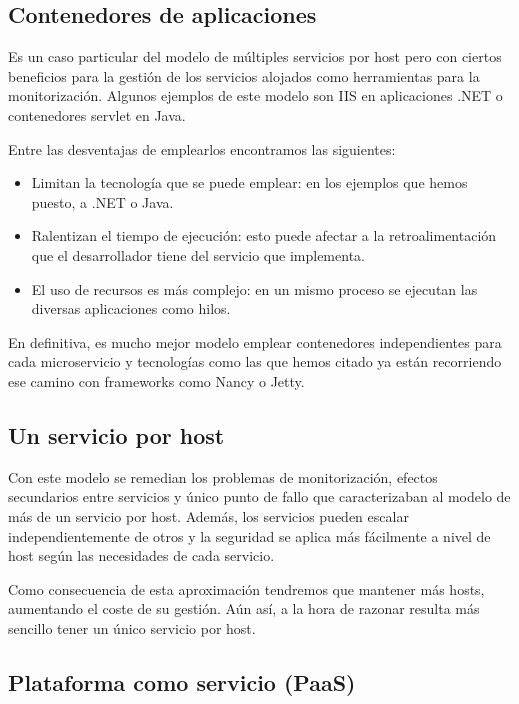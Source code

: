 \documentclass[11pt,a4paper]{article}
\begin{document}
\subsection{Contenedores de aplicaciones}

Es un caso particular del modelo de múltiples servicios por host pero con ciertos beneficios para la gestión de los servicios alojados como herramientas para la monitorización. Algunos ejemplos de este modelo son IIS en aplicaciones .NET o contenedores servlet en Java.

Entre las desventajas de emplearlos encontramos las siguientes:

\begin{itemize}

\item Limitan la tecnología que se puede emplear: en los ejemplos que hemos puesto, a .NET o Java.

\item Ralentizan el tiempo de ejecución: esto puede afectar a la retroalimentación que el desarrollador tiene del servicio que implementa.

\item El uso de recursos es más complejo: en un mismo proceso se ejecutan las diversas aplicaciones como hilos.

\end{itemize}

En definitiva, es mucho mejor modelo emplear contenedores independientes para cada microservicio y tecnologías como las que hemos citado ya están recorriendo ese camino con frameworks como Nancy o Jetty.

\subsection{Un servicio por host}

Con este modelo se remedian los problemas de monitorización, efectos secundarios entre servicios y único punto de fallo que caracterizaban al modelo de más de un servicio por host. Además, los servicios pueden escalar independientemente de otros y la seguridad se aplica más fácilmente a nivel de host según las necesidades de cada servicio.

Como consecuencia de esta aproximación tendremos que mantener más hosts, aumentando el coste de su gestión. Aún así, a la hora de razonar resulta más sencillo tener un único servicio por host.

\subsection{Plataforma como servicio (PaaS)}
\end{document}
